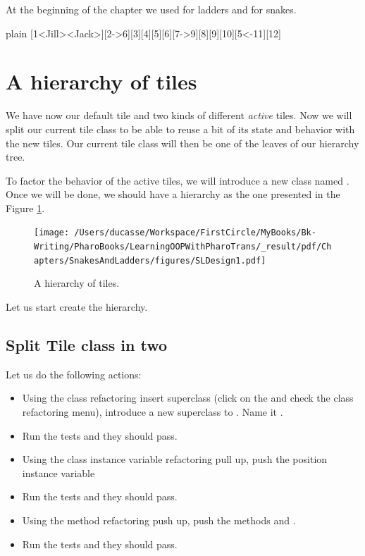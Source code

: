 \documentclass[10pt,twoside,english]{_support/latex/sbabook/sbabook}
\begin{document}
At the beginning of the chapter we used \textcode{-\textgreater{}} for ladders and \textcode{\textless{}-} for snakes. 

\begin{displaycode}{plain}
[1<Jill><Jack>][2->6][3][4][5][6][7->9][8][9][10][5<-11][12]
\end{displaycode}
\section{A hierarchy of tiles}
We have now our default tile and two kinds of different \textit{active} tiles. Now we will split our current tile class to be able to reuse a bit of its state and behavior with the new tiles. Our current tile class will then be one of the leaves of our hierarchy tree.

To factor the behavior of the active tiles, we will introduce a new class named .
Once we will be done, we should have a hierarchy as the one presented in the Figure \ref{fig:sldesign1}.


\begin{figure}

\begin{center}
\texttt{[image: /Users/ducasse/Workspace/FirstCircle/MyBooks/Bk-Writing/PharoBooks/LearningOOPWithPharoTrans/\_result/pdf/Chapters/SnakesAndLadders/figures/SLDesign1.pdf]}\caption{A hierarchy of tiles.\label{fig:sldesign1}}\end{center}
\end{figure}


Let us start create the hierarchy.
\subsection{Split Tile class in two }
Let us do the following actions:

\begin{itemize}
\item Using the class refactoring insert superclass (click on the  and check the class refactoring menu), introduce a new superclass to . Name it . 
\item Run the tests and they should pass.
\item Using the class instance variable refactoring pull up, push the position instance variable
\item Run the tests and they should pass.
\item Using the method refactoring push up, push the methods  and .
\item Run the tests and they should pass.
\end{itemize}
\end{document}
